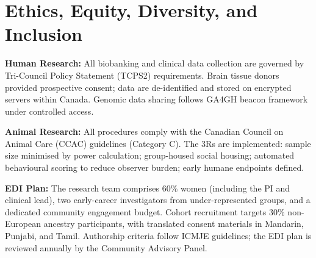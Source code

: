 \section{Ethics, Equity, Diversity, and Inclusion}

\textbf{Human Research:} All biobanking and clinical data collection are governed by Tri-Council Policy Statement (TCPS2) requirements. Brain tissue donors provided prospective consent; data are de-identified and stored on encrypted servers within Canada. Genomic data sharing follows GA4GH beacon framework under controlled access.

\textbf{Animal Research:} All procedures comply with the Canadian Council on Animal Care (CCAC) guidelines (Category C). The 3Rs are implemented: sample size minimised by power calculation; group-housed social housing; automated behavioural scoring to reduce observer burden; early humane endpoints defined.

\textbf{EDI Plan:} The research team comprises 60\% women (including the PI and clinical lead), two early-career investigators from under-represented groups, and a dedicated community engagement budget. Cohort recruitment targets 30\% non-European ancestry participants, with translated consent materials in Mandarin, Punjabi, and Tamil. Authorship criteria follow ICMJE guidelines; the EDI plan is reviewed annually by the Community Advisory Panel.

